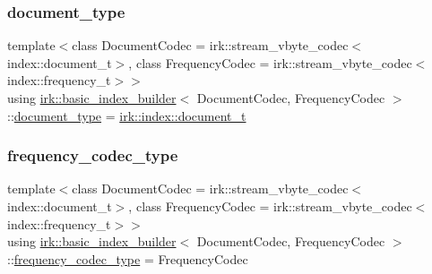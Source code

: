 \mbox{\label{classirk_1_1basic__index__builder_a757a96c8851f4aeee2014a74f60b183e}} 
\subsubsection{\texorpdfstring{document\+\_\+type}{document\_type}}
{\footnotesize\ttfamily template$<$class Document\+Codec  = irk\+::stream\+\_\+vbyte\+\_\+codec$<$index\+::document\+\_\+t$>$, class Frequency\+Codec  = irk\+::stream\+\_\+vbyte\+\_\+codec$<$index\+::frequency\+\_\+t$>$$>$ \\
using \mbox{\hyperlink{classirk_1_1basic__index__builder}{irk\+::basic\+\_\+index\+\_\+builder}}$<$ Document\+Codec, Frequency\+Codec $>$\+::\mbox{\hyperlink{classirk_1_1basic__index__builder_a757a96c8851f4aeee2014a74f60b183e}{document\+\_\+type}} =  \mbox{\hyperlink{namespaceirk_1_1index_af829dedea20da89f9b51b49d78f57006}{irk\+::index\+::document\+\_\+t}}}

\mbox{\label{classirk_1_1basic__index__builder_afbcd5c7087007a9d832bc43e89a9533b}} 
\subsubsection{\texorpdfstring{frequency\+\_\+codec\+\_\+type}{frequency\_codec\_type}}
{\footnotesize\ttfamily template$<$class Document\+Codec  = irk\+::stream\+\_\+vbyte\+\_\+codec$<$index\+::document\+\_\+t$>$, class Frequency\+Codec  = irk\+::stream\+\_\+vbyte\+\_\+codec$<$index\+::frequency\+\_\+t$>$$>$ \\
using \mbox{\hyperlink{classirk_1_1basic__index__builder}{irk\+::basic\+\_\+index\+\_\+builder}}$<$ Document\+Codec, Frequency\+Codec $>$\+::\mbox{\hyperlink{classirk_1_1basic__index__builder_afbcd5c7087007a9d832bc43e89a9533b}{frequency\+\_\+codec\+\_\+type}} =  Frequency\+Codec}

